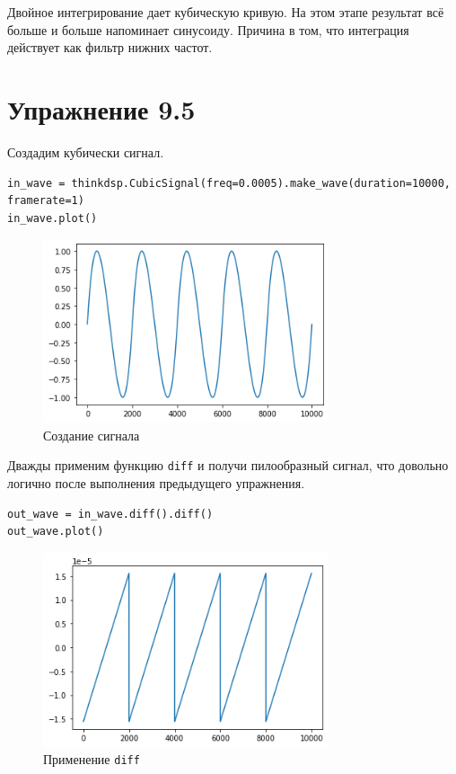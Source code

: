 \documentclass[a4paper,12pt]{report}
\begin{document}
Двойное интегрирование дает кубическую кривую. На этом этапе результат всё больше и больше напоминает синусоиду. Причина в том, что интеграция действует как фильтр нижних частот. 

\chapter{Упражнение 9.5}

Создадим кубически   сигнал.

\begin{lstlisting}[caption=Создание сигнала]
in_wave = thinkdsp.CubicSignal(freq=0.0005).make_wave(duration=10000, framerate=1)
in_wave.plot()
\end{lstlisting}

\begin{figure}[H]
        \centering
        \includegraphics[width=0.75\textwidth]{10.png}
        \caption{Создание сигнала}
        \label{10}
\end{figure}

Дважды применим функцию \texttt{diff} и получи пилообразный сигнал, что довольно логично после выполнения предыдущего упражнения.

\begin{lstlisting}[caption= Применение \texttt{diff}]
out_wave = in_wave.diff().diff()
out_wave.plot()
\end{lstlisting}

\begin{figure}[H]
        \centering
        \includegraphics[width=0.75\textwidth]{11.png}
        \caption{Применение \texttt{diff}}
        \label{11}
\end{figure}
\end{document}
